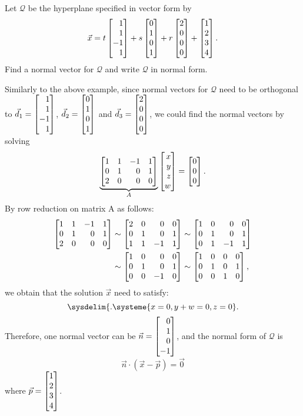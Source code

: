 \begin{example}
	Let $\mathcal Q$ be the hyperplane specified in vector form by
	\[
		\vec x=t\mat{1\\1\\-1\\1}+s\mat{0\\1\\0\\1}+r\mat{2\\0\\0\\0}+\mat{1\\2\\3\\4}.
	\]
	Find a normal vector for $\mathcal Q$ and write $\mathcal Q$ in normal form.

	Similarly to the above example, since normal vectors for $\mathcal Q$ need to be orthogonal to $\vec d_1=\mat{1\\1\\-1\\1}$, $\vec d_2=\mat{0\\1\\0\\1}$ and $\vec d_3=\mat{2\\0\\0\\0}$, we could find the normal vectors by solving
	\[
	\underbrace{\mat{1&1&-1&1\\0&1&0&1\\2&0&0&0}}_A\mat{x\\y\\z\\w}=\mat{0\\0\\0}.
    \]
    By row reduction on matrix A as follows:
    \begin{align*}
        \mat{1&1&-1&1\\0&1&0&1\\2&0&0&0} 
        &\sim \mat{2&0&0&0\\0&1&0&1\\1&1&-1&1}\sim \mat{1&0&0&0\\0&1&0&1\\0&1&-1&1} \\
        &\sim \mat{1&0&0&0\\0&1&0&1\\0&0&-1&0}\sim \mat{1&0&0&0\\0&1&0&1\\0&0&1&0},
    \end{align*}
    we obtain that the solution $\vec x$ need to satisfy:
    \begin{equation}
	\sysdelim\{.
		\systeme{
		    x=0,
			y+w=0,
			z=0
		}.
    \end{equation}
    Therefore, one normal vector can be $\vec n =\mat{0\\1\\0\\-1}$, and the normal form of $\mathcal Q$ is 
    \[
        \vec n\cdot(\vec x-\vec p)=\vec 0
    \]
    where $\vec p=\mat{1\\2\\3\\4}$.
\end{example}




